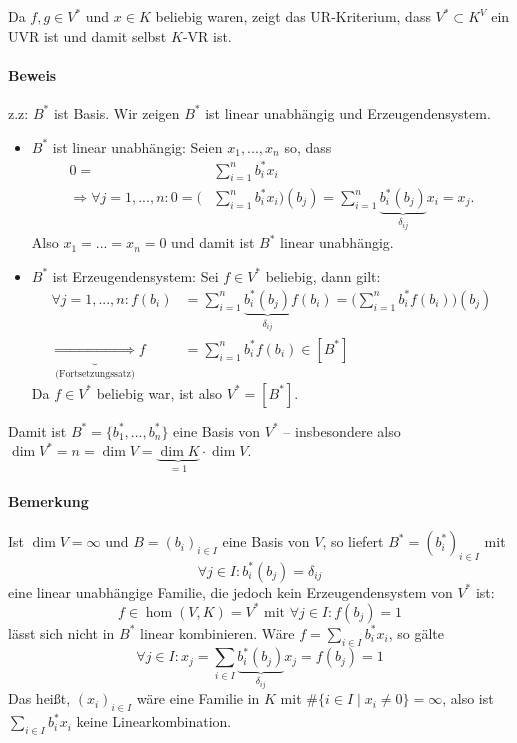 	Da $ f,g\in V^* $ und $ x\in K $ beliebig waren, zeigt das UR-Kriterium, dass $ V^*\subset K^V $ ein UVR ist und damit selbst $ K $-VR ist.
	
\paragraph{Beweis} z.z: $B^*$ ist Basis. Wir zeigen $B^*$ ist linear unabhängig und Erzeugendensystem.
	\begin{itemize}
            \item $ B^* $ ist linear unabhängig: Seien $ x_1,...,x_n $ so, dass
                    \begin{align*}
                        0 = &\sum_{i=1}^{n}b_i^*x_i \\
                        \Rightarrow \forall j=1,...,n: 0 = \Big(&\sum_{i=1}^{n}b_i^*x_i\Big)(b_j) = \sum_{i=1}^{n}\underbrace{b_i^*(b_j)}_{\delta_{ij}}x_i = x_j.
                    \end{align*}
            Also $ x_1 = ... = x_n = 0 $ und damit ist $ B^* $ linear unabhängig.
            \item $ B^* $ ist Erzeugendensystem: Sei $ f\in V^* $ beliebig, dann gilt:
            \begin{align*}
                    \forall j = 1,...,n:f(b_i) &= \sum_{i=1}^{n}\underbrace{b_i^*(b_j)}_{\delta_{ij}}f(b_i) = \Big(\sum_{i=1}^{n}b_i^*f(b_i)\Big)(b_j) \\
                    \underbrace{\Rightarrow}_{\text{(Fortsetzungssatz)}} f &= \sum_{i=1}^{n}b_i^*f(b_i)\in [B^*]
            \end{align*}
            Da $ f\in V^* $ beliebig war, ist also $ V^* = [B^*]$.
	\end{itemize}
	Damit ist $ B^* = \{b_1^*,...,b_n^*\}$ eine Basis von $ V^* $ -- insbesondere also $ \dim V^* = n = \dim V = \underbrace{\dim K}_{=1}\cdot \dim V $.

\paragraph{Bemerkung}
	Ist $\dim V = \infty$ und $B=(b_i)_{i\in I}$ eine Basis von $V$, so liefert $B^\ast=(b_i^\ast)_{i\in I}$ mit 
            \[\forall j\in I:b_i^\ast(b_j)=\delta_{ij}\]
        eine linear unabhängige Familie, die jedoch kein Erzeugendensystem von $V^\ast$ ist:
        \[f\in\hom(V,K)=V^\ast \text{ mit } \forall j\in I:f(b_j)=1\]
        lässt sich nicht in $B^\ast$ linear kombinieren. Wäre $f=\sum_{i\in I}b_i^\ast x_i$, so gälte
            \[\forall j\in I: x_j =\sum_{i\in I}\underbrace{b_i^\ast(b_j)}_{\delta_{ij}}x_j = f(b_j) = 1\]
	Das heißt, $(x_i)_{i\in I}$ wäre eine Familie in $ K $ mit $\#\{i\in I\mid x_i\neq 0\}=\infty$, also ist $\sum_{i\in I}b_i^\ast x_i$ keine Linearkombination.

